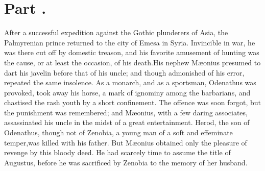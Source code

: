 \section{Part \thesection.}
\thispagestyle{simple}

After a successful expedition against the Gothic plunderers of
Asia, the Palmyrenian prince returned to the city of Emesa in
Syria. Invincible in war, he was there cut off by domestic
treason, and his favorite amusement of hunting was the cause, or
at least the occasion, of his death.\footnotemark[56] His nephew Mæonius
presumed to dart his javelin before that of his uncle; and though
admonished of his error, repeated the same insolence. As a
monarch, and as a sportsman, Odenathus was provoked, took away
his horse, a mark of ignominy among the barbarians, and chastised
the rash youth by a short confinement. The offence was soon
forgot, but the punishment was remembered; and Mæonius, with a
few daring associates, assassinated his uncle in the midst of a
great entertainment. Herod, the son of Odenathus, though not of
Zenobia, a young man of a soft and effeminate temper,\footnotemark[57] was
killed with his father. But Mæonius obtained only the pleasure of
revenge by this bloody deed. He had scarcely time to assume the
title of Augustus, before he was sacrificed by Zenobia to the
memory of her husband.\footnotemark[58]





